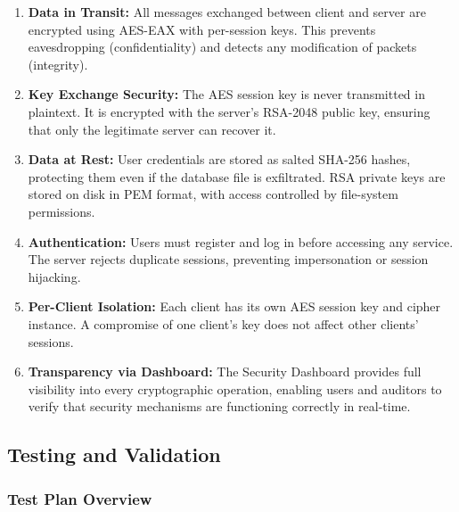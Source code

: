 \documentclass[12pt,a4paper]{article}
\begin{document}
\begin{enumerate}
    \item \textbf{Data in Transit:} All messages exchanged between client and server are encrypted using AES-EAX with per-session keys. This prevents eavesdropping (confidentiality) and detects any modification of packets (integrity).

    \item \textbf{Key Exchange Security:} The AES session key is never transmitted in plaintext. It is encrypted with the server's RSA-2048 public key, ensuring that only the legitimate server can recover it.

    \item \textbf{Data at Rest:} User credentials are stored as salted SHA-256 hashes, protecting them even if the database file is exfiltrated. RSA private keys are stored on disk in PEM format, with access controlled by file-system permissions.

    \item \textbf{Authentication:} Users must register and log in before accessing any service. The server rejects duplicate sessions, preventing impersonation or session hijacking.

    \item \textbf{Per-Client Isolation:} Each client has its own AES session key and cipher instance. A compromise of one client's key does not affect other clients' sessions.

    \item \textbf{Transparency via Dashboard:} The Security Dashboard provides full visibility into every cryptographic operation, enabling users and auditors to verify that security mechanisms are functioning correctly in real-time.
\end{enumerate}

\subsection{Testing and Validation}

\subsubsection{Test Plan Overview}
\end{document}
